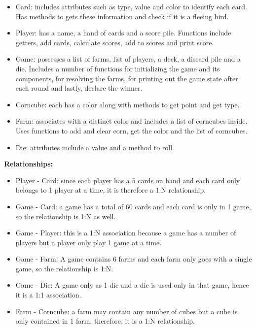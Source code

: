 \documentclass[conference]{IEEEtran}
\begin{document}
\begin{itemize}
    \item Card: includes attributes such as type, value and color to identify each card. Has methods to gets these information and check if it is a fleeing bird.
    \item Player: has a name, a hand of cards and a score pile. Functions include getters, add cards, calculate scores, add to scores and print score.
    \item Game: possesses a list of farms, list of players, a deck, a discard pile and a die. Includes a number of functions for initializing the game and its components, for resolving the farms, for printing out the game state after each round and lastly, declare the winner.
    \item Corncube: each has a color along with methods to get point and get type.
    \item Farm: associates with a distinct color and includes a list of corncubes inside. Uses functions to add and clear corn, get the color and the list of corncubes.
    \item Die: attributes include a value and a method to roll.
\end{itemize}

\textbf{Relationships:}

\begin{itemize}
    \item Player - Card: since each player has a 5 cards on hand and each card only belongs to 1 player at a time, it is therefore a 1:N relationship.
    \item Game - Card: a game has a total of 60 cards and each card is only in 1 game, so the relationship is 1:N as well.
    \item Game - Player: this is a 1:N association because a game has a number of players but a player only play 1 game at a time.
    \item Game - Farm: A game contains 6 farms and each farm only goes with a single game, so the relationship is 1:N.
    \item Game - Die: A game only as 1 die and a die is used only in that game, hence it is a 1:1 association.
    \item Farm - Corncube: a farm may contain any number of cubes but a cube is only contained in 1 farm, therefore, it is a 1:N relationship.
\end{itemize}
\end{document}
